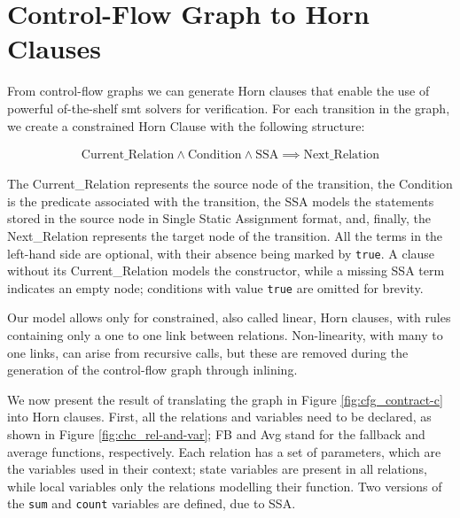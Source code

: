 \section{Control-Flow Graph to Horn Clauses}

From control-flow graphs we can generate Horn clauses that enable the use of powerful of-the-shelf smt solvers for verification. For each transition in the graph, we create a constrained Horn Clause with the following structure:

\begin{align*}
\text{Current\_Relation} \land \text{Condition} \land \text{SSA} \implies \text{Next\_Relation}
\end{align*}

The Current\_Relation represents the source node of the transition, the Condition is the predicate associated with the transition, the SSA models the statements stored in the source node in Single Static Assignment format, and, finally, the Next\_Relation represents the target node of the transition. All the terms in the left-hand side are optional, with their absence being marked by \texttt{true}. A clause without its Current\_Relation models the constructor, while a missing SSA term indicates an empty node; conditions with value \texttt{true} are omitted for brevity.

Our model allows only for constrained, also called linear, Horn clauses, with rules containing only a one to one link between relations. Non-linearity, with many to one links, can arise from recursive calls, but these are removed during the generation of the control-flow graph through inlining.

We now present the result of translating the graph in Figure \ref{fig:cfg_contract-c} into Horn clauses. First, all the relations and variables need to be declared, as shown in Figure \ref{fig:chc_rel-and-var}; FB and Avg stand for the fallback and average functions, respectively. Each relation has a set of parameters, which are the variables used in their context; state variables are present in all relations, while local variables only the relations modelling their function. Two versions of the \texttt{sum} and \texttt{count} variables are defined, due to SSA.

